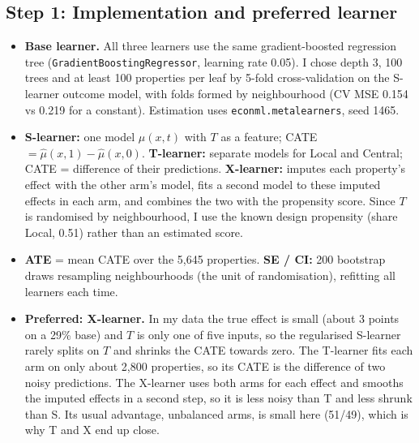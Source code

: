 \documentclass[11pt]{article}
\begin{document}
\subsection{Step 1: Implementation and preferred learner}
\begin{itemize}
\item \textbf{Base learner.} All three learners use the same gradient-boosted regression tree (\texttt{GradientBoostingRegressor}, learning rate 0.05). I chose depth 3, 100 trees and at least 100 properties per leaf by 5-fold cross-validation on the S-learner outcome model, with folds formed by neighbourhood (CV MSE 0.154 vs 0.219 for a constant). Estimation uses \texttt{econml.metalearners}, seed 1465.
\item \textbf{S-learner:} one model $\hat\mu(x,t)$ with $T$ as a feature; CATE $=\hat\mu(x,1)-\hat\mu(x,0)$. \textbf{T-learner:} separate models for Local and Central; CATE = difference of their predictions. \textbf{X-learner:} imputes each property's effect with the other arm's model, fits a second model to these imputed effects in each arm, and combines the two with the propensity score. Since $T$ is randomised by neighbourhood, I use the known design propensity (share Local, 0.51) rather than an estimated score.
\item \textbf{ATE} = mean CATE over the 5,645 properties. \textbf{SE / CI:} 200 bootstrap draws resampling neighbourhoods (the unit of randomisation), refitting all learners each time.
\item \textbf{Preferred: X-learner.} In my data the true effect is small (about 3 points on a 29\% base) and $T$ is only one of five inputs, so the regularised S-learner rarely splits on $T$ and shrinks the CATE towards zero. The T-learner fits each arm on only about 2,800 properties, so its CATE is the difference of two noisy predictions. The X-learner uses both arms for each effect and smooths the imputed effects in a second step, so it is less noisy than T and less shrunk than S. Its usual advantage, unbalanced arms, is small here (51/49), which is why T and X end up close.
\end{itemize}
\end{document}
